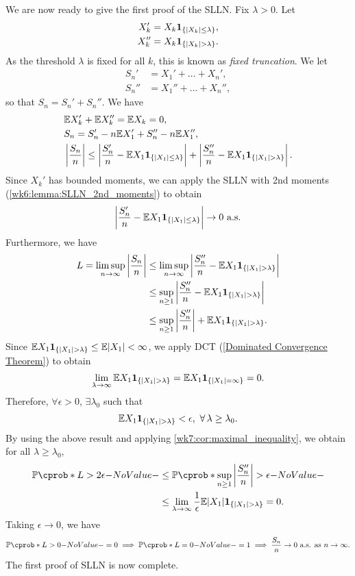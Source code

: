 \documentclass[12pt]{article}
\begin{document}
We are now ready to give the first proof of the SLLN. Fix $\lambda>0$. Let
\begin{align*}
X_k' &= X_k {\bf 1}_{\{|X_k| \leq \lambda\}}, \\
X_k'' &= X_k {\bf 1}_{\{|X_k| > \lambda\}}.
\end{align*}
As the threshold $\lambda$ is fixed for all $k$, this is known as \emph{fixed truncation}. We let
\begin{align*}
S_n' &= X_1' + \ldots + X_n', \\
S_n'' &= X_1'' + \ldots + X_n'',
\end{align*}
so that $S_n = S_n' + S_n''$. We have
\begin{align*}
&\E X_k' + \E X_k'' = \E X_k = 0, \\
& S_n = S_n' - n\E X_1' + S_n'' - n\E X_1'',\\
&\left| \frac{S_n}{n} \right| \leq 
\left| \frac{S_n'}{n} - \E X_1 \indicatore{\{|X_1| \leq \lambda\}} \right| +
\left| \frac{S_n''}{n} - \E X_1 \indicatore{\{|X_1| > \lambda\}} \right|.
\end{align*}
Since $X_k'$ has bounded moments, we can apply the SLLN with 2nd moments (\cref{wk6:lemma:SLLN_2nd_moments}) to obtain
\begin{align*}
\left| \frac{S_n'}{n} - \E X_1 \indicatore{\{|X_1| \leq \lambda\}} \right| \to 0 \ \text{a.s.}
\end{align*}
Furthermore, we have
\begin{align*}
L =
\limsup_{n \to \infty} \left| \frac{S_n}{n} \right|
&\leq \limsup_{n \to \infty} \left| \frac{S_n''}{n} - \E X_1 \indicatore{\{|X_1| > \lambda\}} \right| \\
&\leq \sup_{n \geq 1} \left| \frac{S_n''}{n} - \E X_1 \indicatore{\{|X_1| > \lambda\}} \right| \\
&\leq \sup_{n \geq 1} \left| \frac{S_n''}{n} \right| + \E X_1 \indicatore{\{|X_1| > \lambda\}} .
\end{align*}
Since $\E X_1 \indicatore{\{|X_1| > \lambda\}} \leq \E |X_1| < \infty$, we apply DCT (\cref{Dominated Convergence Theorem}) to obtain
\begin{align*}
\lim_{\lambda \to \infty} \E X_1 \indicatore{\{|X_1| > \lambda\}} 
= \E X_1 \indicatore{\{|X_1| = \infty\}} = 0.
\end{align*}
Therefore, $\forall \epsilon > 0$, $\exists \lambda_0$ such that
\begin{align*}
\E X_1 \indicatore{\{|X_1| > \lambda\}} < \epsilon,\ \forall \lambda \geq \lambda_0.
\end{align*}
By using the above result and applying \cref{wk7:cor:maximal_inequality}, we obtain for all $\lambda \geq \lambda_0$, 
\begin{align*}
\P(L > 2\epsilon) 
&\leq \P(\sup_{n \geq 1} \left| \frac{S_n''}{n} \right| > \epsilon) \\
&\leq \lim_{\lambda \to \infty} \frac{1}{\epsilon} \E |X_1| \indicatore{\{|X_1| > \lambda\}} = 0.
\end{align*}
Taking $\epsilon \to 0$, we have
\begin{align*}
\P(L > 0) = 0 \implies \P(L = 0) = 1
\implies
\frac{S_n}{n} \to 0 \ \text{a.s. as} \ n \to \infty.
\end{align*}
The first proof of SLLN is now complete.
%
%
\end{document}
